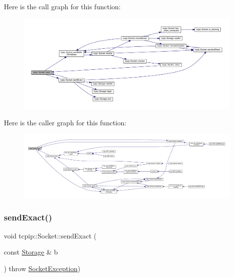 Here is the call graph for this function\+:
\nopagebreak
\begin{figure}[H]
\begin{center}
\leavevmode
\includegraphics[width=350pt]{classtcpip_1_1_socket_acb91f20e7a532159a8daa2796fa4abd4_cgraph}
\end{center}
\end{figure}
Here is the caller graph for this function\+:
\nopagebreak
\begin{figure}[H]
\begin{center}
\leavevmode
\includegraphics[width=350pt]{classtcpip_1_1_socket_acb91f20e7a532159a8daa2796fa4abd4_icgraph}
\end{center}
\end{figure}
\mbox{\label{classtcpip_1_1_socket_a6d00027b40f48d4ae19e3fff2e89f7ab}} 
\subsubsection{\texorpdfstring{send\+Exact()}{sendExact()}}
{\footnotesize\ttfamily void tcpip\+::\+Socket\+::send\+Exact (\begin{DoxyParamCaption}\item[{const \hyperlink{classtcpip_1_1_storage}{Storage} \&}]{b }\end{DoxyParamCaption}) throw  \hyperlink{classtcpip_1_1_socket_exception}{Socket\+Exception}) }


